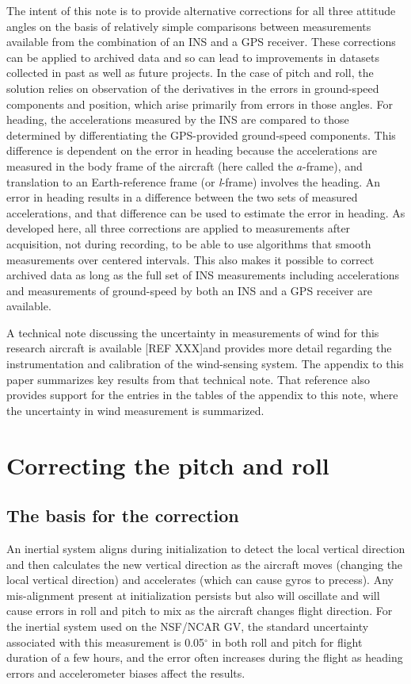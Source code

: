 \documentclass[english,british,amt,bookmarks=false,unicode=true]{copernicus}\usepackage[]{graphicx}\usepackage[]{color}
\begin{document}
The intent of this note is to provide alternative corrections for
all three attitude angles on the basis of relatively simple comparisons
between measurements available from the combination of an INS and
a GPS receiver. These corrections can be applied to archived data
and so can lead to improvements in datasets collected in past as well
as future projects. In the case of pitch and roll, the solution relies
on observation of the derivatives in the errors in ground-speed components
and position, which arise primarily from errors in those angles. For
heading, the accelerations measured by the INS are compared to those
determined by differentiating the GPS-provided ground-speed components.
This difference is dependent on the error in heading because the accelerations
are measured in the body frame of the aircraft (here called\emph{
}the $a$-frame), and translation to an Earth-reference frame (or
\emph{l}-frame) involves the heading. An error in heading results
in a difference between the two sets of measured accelerations, and
that difference can be used to estimate the error in heading. As developed
here, all three corrections are applied to measurements after acquisition,
not during recording, to be able to use algorithms that smooth measurements
over centered intervals. This also makes it possible to correct archived
data as long as the full set of INS measurements including accelerations
and measurements of ground-speed by both an INS and a GPS receiver
are available.

A technical note discussing the uncertainty in measurements of wind
for this research aircraft is available {[}REF XXX{]}and provides
more detail regarding the instrumentation and calibration of the wind-sensing
system. The appendix to this paper summarizes key results from that
technical note. That reference also provides support for the entries
in the tables of the appendix to this note, where the uncertainty
in wind measurement is summarized.


\section{Correcting the pitch and roll\label{sec:Correcting-the-pitch}}


\subsection{The basis for the correction\label{sub:Sect2.1}}

An inertial system aligns during initialization to detect the local
vertical direction and then calculates the new vertical direction
as the aircraft moves (changing the local vertical direction) and
accelerates (which can cause gyros to precess). Any mis-alignment
present at initialization persists but also will oscillate and will
cause errors in roll and pitch to mix as the aircraft changes flight
direction. For the inertial system used on the NSF/NCAR GV, the standard
uncertainty associated with this measurement is 0.05$^{\circ}$ in
both roll and pitch for flight duration of a few hours, and the error
often increases during the flight as heading errors and accelerometer
biases affect the results. 
\end{document}
